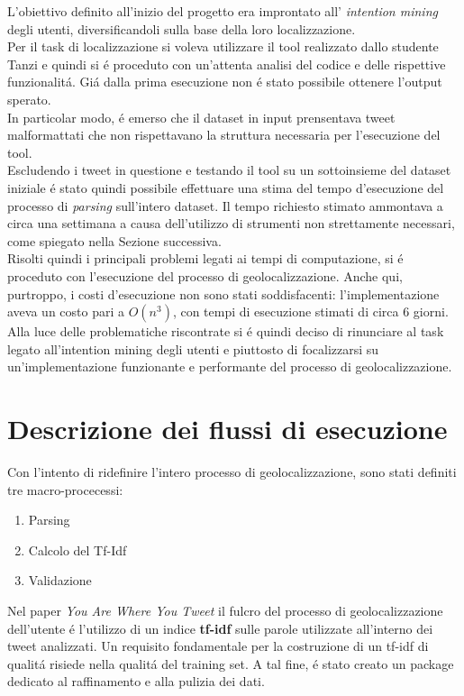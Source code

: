 \documentclass[twocolumn,10pt]{asme2ej}
\begin{document}
L'obiettivo definito all'inizio del progetto era improntato all' \textit{intention mining} degli utenti, diversificandoli sulla base della loro localizzazione. \\ Per il task di localizzazione si voleva utilizzare il tool realizzato dallo studente Tanzi e quindi si \'e proceduto con un'attenta analisi del codice e delle rispettive funzionalit\'a.
Gi\'a dalla prima esecuzione non \'e stato possibile ottenere l'output sperato. \\In particolar modo, \'e emerso che il dataset in input prensentava tweet malformattati che non rispettavano la struttura necessaria per l'esecuzione del tool. \\ Escludendo i tweet in questione e testando il tool su un sottoinsieme del dataset iniziale \'e stato quindi possibile effettuare una stima del tempo d'esecuzione del processo di \textit{parsing} sull'intero dataset. Il tempo richiesto stimato ammontava a circa una settimana a causa dell'utilizzo di strumenti non strettamente necessari, come spiegato nella Sezione successiva.  \\ Risolti quindi i principali problemi legati ai tempi di computazione, si \'e proceduto con l'esecuzione del processo di geolocalizzazione. Anche qui, purtroppo, i costi d'esecuzione non sono stati soddisfacenti: l'implementazione aveva un costo pari a $O(n^3)$, con tempi di esecuzione stimati di circa 6 giorni.\\ Alla luce delle problematiche riscontrate si \'e quindi deciso di rinunciare al task legato all'intention mining degli utenti e piuttosto di focalizzarsi su un'implementazione funzionante e performante del processo di geolocalizzazione.

\section{Descrizione dei flussi di esecuzione}


Con l'intento di ridefinire l'intero processo di geolocalizzazione, sono stati definiti tre macro-procecessi:
\begin{enumerate}
\item Parsing
\item Calcolo del Tf-Idf
\item Validazione
\end{enumerate}   

Nel paper \textit{You Are Where You Tweet} il fulcro del processo di geolocalizzazione dell'utente \'e l'utilizzo di un indice \textbf{tf-idf} sulle parole utilizzate all'interno dei tweet analizzati. Un requisito fondamentale per la costruzione di un tf-idf di qualit\'a risiede nella qualit\'a del training set. A tal fine, \'e stato creato un package dedicato al raffinamento e alla pulizia dei dati. 
\end{document}
